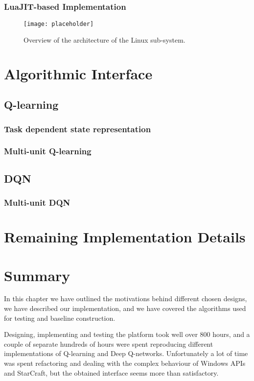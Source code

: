 \subsubsection{LuaJIT-based Implementation}

\begin{figure}[h]
    \centering
    \texttt{[image: placeholder]}
    \caption{Overview of the architecture of the Linux sub-system.}
    \label{fig:arch_linux}
\end{figure}

\section{Algorithmic Interface}

\subsection{Q-learning}

\subsubsection{Task dependent state representation}

\subsubsection{Multi-unit Q-learning}

\subsection{DQN}

\subsubsection{Multi-unit DQN}

\section{Remaining Implementation Details}

\section{Summary}

In this chapter we have outlined the motivations behind different chosen
designs, we have described our implementation, and we have covered the algorithms
used for testing and baseline construction.

Designing, implementing and testing the platform took well over 800 hours, and a
couple of separate hundreds of hours were spent reproducing different
implementations of Q-learning and Deep Q-networks. Unfortunately a lot of time
was spent refactoring and dealing with the complex behaviour of Windows APIs and
StarCraft, but the obtained interface seems more than satisfactory.
